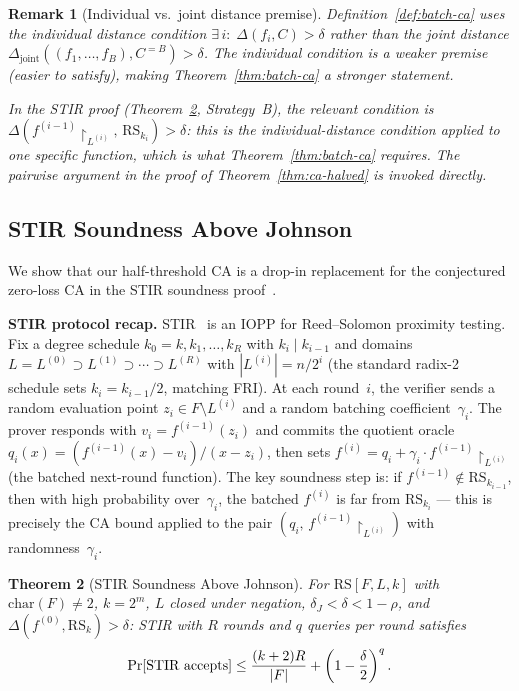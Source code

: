 \documentclass[11pt]{article}
\newtheorem{theorem}{Theorem}
\newtheorem{remark}[theorem]{Remark}
\newcommand{\RS}{\mathrm{RS}}
\begin{document}
\begin{remark}[Individual vs.\ joint distance premise]
\label{rem:joint-batch}
Definition~\ref{def:batch-ca} uses the \emph{individual} distance condition $\exists\,i:\;\Delta(f_i, C) > \delta$ rather than the \emph{joint} distance $\Delta_{\mathrm{joint}}((f_1, \ldots, f_B), C^{=B}) > \delta$. The individual condition is a \emph{weaker} premise (easier to satisfy), making Theorem~\ref{thm:batch-ca} a \emph{stronger} statement.

In the STIR proof (Theorem~\ref{thm:stir-full}, Strategy~B), the relevant condition is $\Delta(f^{(i-1)}\!\!\restriction_{L^{(i)}},\, \RS_{k_i}) > \delta$: this is the individual-distance condition applied to one specific function, which is what Theorem~\ref{thm:batch-ca} requires. The pairwise argument in the proof of Theorem~\ref{thm:ca-halved} is invoked directly.
\end{remark}


\subsection{STIR Soundness Above Johnson}
\label{subsec:stir}

We show that our half-threshold CA is a drop-in replacement for the conjectured zero-loss CA in the STIR soundness proof~\cite{STIR}.

\medskip
\noindent\textbf{STIR protocol recap.} STIR~\cite{STIR} is an IOPP for Reed--Solomon proximity testing. Fix a degree schedule $k_0 = k, k_1, \ldots, k_R$ with $k_{i} \mid k_{i-1}$ and domains $L = L^{(0)} \supset L^{(1)} \supset \cdots \supset L^{(R)}$ with $|L^{(i)}| = n / 2^i$ (the standard radix-2 schedule sets $k_i = k_{i-1}/2$, matching FRI). At each round~$i$, the verifier sends a random evaluation point $z_i \in F \setminus L^{(i)}$ and a random batching coefficient~$\gamma_i$. The prover responds with $v_i = f^{(i-1)}(z_i)$ and commits the quotient oracle $q_i(x) = (f^{(i-1)}(x) - v_i)/(x - z_i)$, then sets $f^{(i)} = q_i + \gamma_i \cdot f^{(i-1)}\!\!\restriction_{L^{(i)}}$ (the batched next-round function). The key soundness step is: if $f^{(i-1)} \notin \RS_{k_{i-1}}$, then with high probability over~$\gamma_i$, the batched $f^{(i)}$ is far from $\RS_{k_i}$ --- this is precisely the CA bound applied to the pair $(q_i,\, f^{(i-1)}\!\!\restriction_{L^{(i)}})$ with randomness~$\gamma_i$.

\begin{theorem}[STIR Soundness Above Johnson]
\label{thm:stir-full}
For $\RS[F, L, k]$ with $\mathrm{char}(F) \neq 2$, $k = 2^m$, $L$ closed under negation, $\delta_J < \delta < 1{-}\rho$, and $\Delta(f^{(0)}, \RS_k) > \delta$: STIR with $R$ rounds and $q$ queries per round satisfies
$$\Pr[\textup{STIR accepts}] \leq \frac{(k + 2)R}{|F|} + \left(1 - \frac{\delta}{2}\right)^q.$$
\end{theorem}
\end{document}
